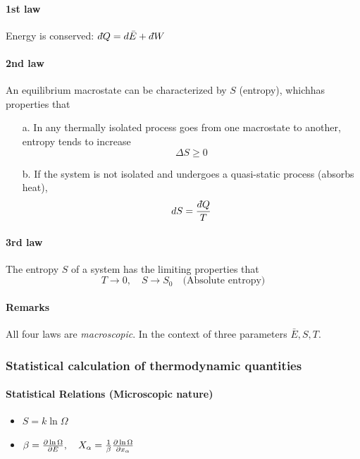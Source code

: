 \documentclass[../main.tex]{subfiles}
\begin{document}
\paragraph{1st law} Energy is conserved: $d\hspace*{-0.08em}\bar{}\hspace*{0.1em} Q = d\bar E + d\hspace*{-0.08em}\bar{}\hspace*{0.1em} W$

\paragraph{2nd law} An equilibrium macrostate can be characterized by $S$ (entropy),
whichhas properties that
\begin{enumerate}
    \item [a.] In any thermally isolated process goes from one macrostate to another,
    entropy tends to increase
    \[ \Delta S \geq 0 \]
    \item [b.] If the system is not isolated and undergoes a quasi-static process (absorbs heat),
    \[ dS = \frac{d\hspace*{-0.08em}\bar{}\hspace*{0.1em} Q}{T} \]
\end{enumerate}

\paragraph{3rd law} The entropy $S$ of a system has the limiting properties that
\[ T \to 0, \quad S \to S_0 \quad \textrm{(Absolute entropy)} \]

\paragraph{Remarks} All four laws are \textit{macroscopic}. In the context of three parameters $\bar E, S, T$.

\subsubsection{Statistical calculation of thermodynamic quantities}

\paragraph{Statistical Relations (Microscopic nature)}

\begin{itemize}
    \item $S = k\ln \Omega$
    \item $\beta = \pdv{\ln \Omega}{E}, \quad X_\alpha = \frac{1}{\beta} \pdv{\ln \Omega}{x_\alpha}$
\end{itemize}
\end{document}
